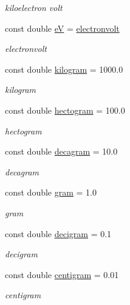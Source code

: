 \begin{DoxyCompactItemize}
\begin{DoxyCompactList}\small\item\em kiloelectron volt \end{DoxyCompactList}\item 
const double \hyperlink{namespace_utilities_a373e9baeec7c88baef6b6ba4f782097b}{eV} = \hyperlink{namespace_utilities_a0045e627e65f14bccdf9ba29f46f4b39}{electronvolt}
\begin{DoxyCompactList}\small\item\em electronvolt \end{DoxyCompactList}\item 
const double \hyperlink{namespace_utilities_a53892b9a331b44b7edb02383d2d3cc74}{kilogram} = 1000.0
\begin{DoxyCompactList}\small\item\em kilogram \end{DoxyCompactList}\item 
const double \hyperlink{namespace_utilities_a06ccbbfaf687e7c9567fe53a74a815a4}{hectogram} = 100.0
\begin{DoxyCompactList}\small\item\em hectogram \end{DoxyCompactList}\item 
const double \hyperlink{namespace_utilities_a0768cb48610ba03979360e95959f44d9}{decagram} = 10.0
\begin{DoxyCompactList}\small\item\em decagram \end{DoxyCompactList}\item 
const double \hyperlink{namespace_utilities_a31f2c5ded8f5f13007b4704e0509ce8c}{gram} = 1.0
\begin{DoxyCompactList}\small\item\em gram \end{DoxyCompactList}\item 
const double \hyperlink{namespace_utilities_a19cffac32ac7c8d1d469398620265431}{decigram} = 0.1
\begin{DoxyCompactList}\small\item\em decigram \end{DoxyCompactList}\item 
const double \hyperlink{namespace_utilities_ae4b25dba2b30ec640f00b47acb80ff34}{centigram} = 0.01
\begin{DoxyCompactList}\small\item\em centigram \end{DoxyCompactList}\item 

\end{DoxyCompactItemize}
